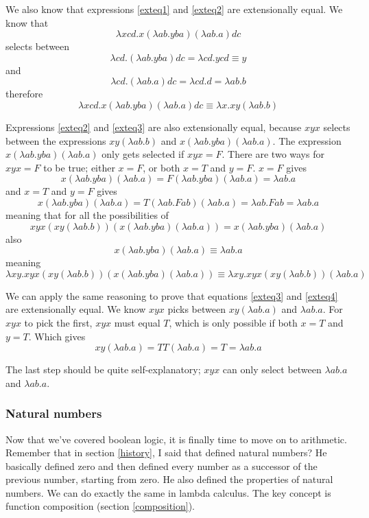 \documentclass[11pt]{article}
\begin{document}
We also know that expressions \ref{exteq1} and \ref{exteq2} are extensionally
equal. We know that
\[\lambda xcd.x(\lambda ab.yba)(\lambda ab.a)dc\]
selects between
\[\lambda cd.(\lambda ab.yba)dc=\lambda cd.ycd\equiv y\]
and
\[\lambda cd.(\lambda ab.a)dc=\lambda cd.d=\lambda ab.b\]
therefore
\[\lambda xcd.x(\lambda ab.yba)(\lambda ab.a)dc\equiv\lambda x.xy(\lambda ab.b)\]

Expressions \ref{exteq2} and \ref{exteq3} are also extensionally equal, because
\(xyx\) selects between the expressions \(xy(\lambda ab.b)\) and \(x(\lambda
ab.yba)(\lambda ab.a)\). The expression \(x(\lambda ab.yba)(\lambda ab.a)\)
only gets selected if \(xyx=F\). There are two ways for \(xyx=F\) to be true;
either \(x=F\), or both \(x=T\) and \(y=F\). \(x=F\) gives
\[x(\lambda ab.yba)(\lambda ab.a)=F(\lambda ab.yba)(\lambda ab.a)=\lambda ab.a\]
and \(x=T\) and \(y=F\) gives
\[
	x(\lambda ab.yba)(\lambda ab.a)
	=T(\lambda ab.Fab)(\lambda ab.a)
	=\lambda ab.Fab
	=\lambda ab.a
\]
meaning that for all the possibilities of
\[
	xyx(xy(\lambda ab.b))(x(\lambda ab.yba)(\lambda ab.a))
	=x(\lambda ab.yba)(\lambda ab.a)
\]
also
\[x(\lambda ab.yba)(\lambda ab.a)\equiv\lambda ab.a\]
meaning
\[
	\lambda xy.xyx(xy(\lambda ab.b))(x(\lambda ab.yba)(\lambda ab.a))
	\equiv\lambda xy.xyx(xy(\lambda ab.b))(\lambda ab.a)
\]

We can apply the same reasoning to prove that equations \ref{exteq3} and
\ref{exteq4} are extensionally equal. We know \(xyx\) picks between
\(xy(\lambda ab.a)\) and \(\lambda ab.a\). For \(xyx\) to pick the first,
\(xyx\) must equal \(T\), which is only possible if both \(x=T\) and \(y=T\).
Which gives
\[xy(\lambda ab.a)=TT(\lambda ab.a)=T=\lambda ab.a\]

The last step should be quite self-explanatory; \(xyx\) can only select
between \(\lambda ab.a\) and \(\lambda ab.a\).

\subsubsection{Natural numbers}\label{natural_numbers}

Now that we've covered boolean logic, it is finally time to move on to
arithmetic. Remember that in section \ref{history}, I said that
\textcite{peano1889} defined natural numbers? He basically defined zero and
then defined every number as a successor of the previous number, starting from
zero. He also defined the properties of natural numbers. We can do exactly the
same in lambda calculus. The key concept is function composition (section
\ref{composition}).
\end{document}
